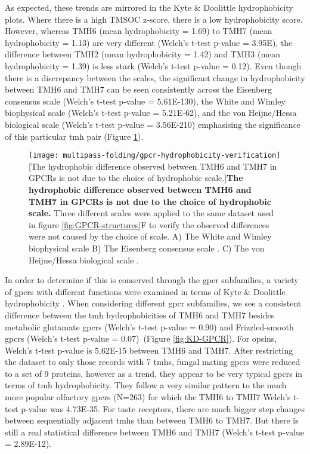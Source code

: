 As expected, these trends are mirrored in the Kyte \& Doolittle \cite{Kyte1982} hydrophobicity plots.
Where there is a high TMSOC z\--score, there is a low hydrophobicity score.
However, whereas TMH6 (mean hydrophobicity = 1.69) to TMH7 (mean hydrophobicity = 1.13) are very different (Welch's t\--test p\--value = 3.95E), the difference between TMH2 (mean hydrophobicity = 1.42) and TMH3 (mean hydrophobicity = 1.39) is less stark (Welch's t\--test p\--value = 0.12).
Even though there is a discrepancy between the scales, the significant change in hydrophobicity  between TMH6 and TMH7 can be seen consistently across the Eisenberg consensus scale \cite{Eisenberg1984} (Welch's t\--test p\--value = 5.61E-130), the White and Wimley biophysical scale \cite{White1999} (Welch's t\--test p\--value = 5.21E-62), and the von Heijne/Hessa biological scale \cite{Hessa2005} (Welch's t\--test p\--value = 3.56E-210) emphasising the significance of this particular \gls{tmh} pair (Figure \ref{fig:gpcr-hydrophobicity-verification}).

\begin{figure}[!ht]
\centering
\texttt{[image: multipass-folding/gpcr-hydrophobicity-verification]}
		[The hydrophobic difference observed between TMH6 and TMH7 in GPCRs is not due to the choice of hydrophobic scale.]{\textbf{The hydrophobic difference observed between TMH6 and TMH7 in GPCRs is not due to the choice of hydrophobic scale.}
    Three different scales were applied to the same dataset used in figure \ref{fig:GPCR-structures}F to verify the observed differences were not caused by the choice of scale.
    A) The White and Wimley biophysical scale \cite{White1999}
    B) The Eisenberg consensus scale \cite{Eisenberg1984}.
    C) The von Heijne/Hessa biological scale \cite{Hessa2005}.}

\label{fig:gpcr-hydrophobicity-verification}
\end{figure}

In order to determine if this is conserved through the \gls{gpcr} subfamilies, a variety of \gls{gpcr}s with different functions were examined in terms of Kyte \& Doolittle hydrophobicity \cite{Kyte1982}.
When considering different \gls{gpcr} subfamilies, we see a consistent difference between the \gls{tmh} hydrophobicities of TMH6 and TMH7 besides metabolic glutamate \gls{gpcr}s (Welch's t\--test p\--value = 0.90) and Frizzled-smooth \gls{gpcr}s (Welch's t\--test p\--value = 0.07)~(Figure \ref{fig:KD-GPCR}).
For opsins, Welch's t\--test p\--value is 5.62E-15 between TMH6 and TMH7.
After restricting the dataset to only those records with 7 \gls{tmh}s, fungal mating \gls{gpcr}s were reduced to a set of 9 proteins, however as a trend, they appear to be very typical \gls{gpcr}s in terms of \gls{tmh} hydrophobicity.
They follow a very similar pattern to the much more popular olfactory \gls{gpcr}s (N=263) for which the TMH6 to TMH7 Welch's t\--test p\--value was 4.73E-35.
For taste receptors, there are much bigger step changes between sequentially adjacent \gls{tmh}s than between TMH6 to TMH7.
But there is still a real statistical difference between TMH6 and TMH7 (Welch's t\--test p\--value = 2.89E-12).

